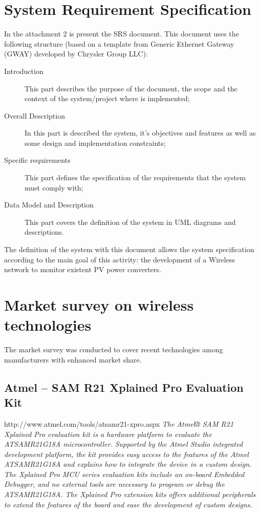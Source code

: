 \section{System Requirement Specification}
In the attachment 2 is present the SRS document. This document uses the following structure (based on a template from Generic Ethernet Gateway (GWAY) developed by Chrysler Group LLC):
\begin{description}
	\item[Introduction] This part describes the purpose of the document, the scope and the context of the system/project where is implemented;
	
	\item[Overall Description] In this part is described the system, it's objectives and features as well as some design and implementation constraints;
	
	\item[Specific requirements] This part defines the specification of the requirements that the system must comply with;
	
	\item[Data Model and Description] This part covers the definition of the system in UML diagrams and descriptions.
			
\end{description}

The definition of the system with this document allows the system specification according to the main goal of this activity: the development of a Wireless network to monitor existent PV power converters.

\section{Market	survey on wireless technologies}
The market survey was conducted to cover recent technologies among manufacturers with enhanced market share.

\subsection{Atmel -- SAM R21 Xplained Pro Evaluation Kit}



\begin{framed}

	http://www.atmel.com/tools/atsamr21-xpro.aspx
\vspace{1em}
	\hline
\vspace{1em}
\small
\textit{The Atmel® SAM R21 Xplained Pro evaluation kit is a hardware platform to evaluate the ATSAMR21G18A microcontroller. Supported by the Atmel Studio integrated development platform, the kit provides easy access to the features of the Atmel ATSAMR21G18A and explains how to integrate the device in a custom design. The Xplained Pro MCU series evaluation kits include an on-board Embedded Debugger, and no external tools are necessary to program or debug the ATSAMR21G18A. The Xplained Pro extension kits offers additional peripherals to extend the features of the board and ease the development of custom designs.}
\end{framed}

